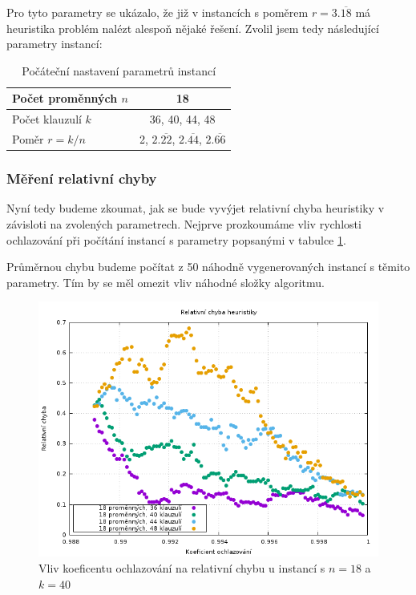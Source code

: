 \documentclass[11pt]{article}
\begin{document}
Pro tyto parametry se ukázalo, že již v instancích s poměrem $ r = 3.\overline{18}$ má heuristika problém nalézt alespoň nějaké řešení. Zvolil jsem tedy následující parametry instancí:

\bgroup
\def\arraystretch{1.2}
\begin{table}[h!]
	\centering
	\begin{tabular}{| l | c | }
	\hline
	Počet proměnných $n$ & 18  \\ \hline
	Počet klauzulí $k$ & 36, 40, 44, 48  \\ \hline
	Poměr $r = k/n$ & 2, $2.\overline{22}$, $2.\overline{44}$, $2.\overline{66}$\\
	\hline
	\end{tabular}
	\caption{Počáteční nastavení parametrů instancí}
	\label{tab:params2}
\end{table}
\egroup

\subsubsection{Měření relativní chyby}
\label{sec:rel_e_measure}

Nyní tedy budeme zkoumat, jak se bude vyvýjet relativní chyba heuristiky v závisloti na zvolených parametrech. Nejprve prozkoumáme vliv rychlosti ochlazování při počítání instancí s parametry popsanými v tabulce \ref{tab:params2}. 

Průměrnou chybu budeme počítat z 50 náhodně vygenerovaných instancí s těmito parametry. Tím by se měl omezit vliv náhodné složky algoritmu.

\begin{figure}[h!]
	\centering
	\includegraphics[width=\textwidth]{../grafy/18_40_cooling_e.png}
	\caption{Vliv koeficentu ochlazování na relativní chybu u instancí s $n=18$ a $k=40$}
	\label{fig:18_40_cooling_e}
\end{figure}
\end{document}
